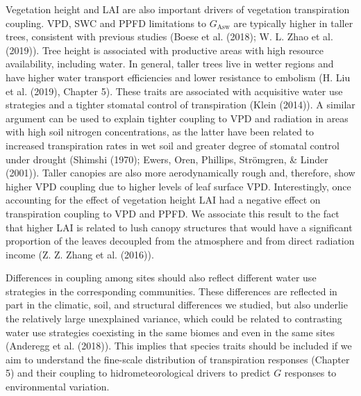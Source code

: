 \documentclass[11pt,twoside]{reedthesis}
\begin{document}
Vegetation height and LAI are also important drivers of vegetation
transpiration coupling. VPD, SWC and PPFD limitations to
\(G_{\text{Asw}}\) are typically higher in taller trees, consistent with
previous studies (Boese et al. (2018); W. L. Zhao et al. (2019)). Tree
height is associated with productive areas with high resource
availability, including water. In general, taller trees live in wetter
regions and have higher water transport efficiencies and lower
resistance to embolism (H. Liu et al. (2019), Chapter 5). These traits
are associated with acquisitive water use strategies and a tighter
stomatal control of transpiration (Klein (2014)). A similar argument can
be used to explain tighter coupling to VPD and radiation in areas with
high soil nitrogen concentrations, as the latter have been related to
increased transpiration rates in wet soil and greater degree of stomatal
control under drought (Shimshi (1970); Ewers, Oren, Phillips, Strömgren,
\& Linder (2001)). Taller canopies are also more aerodynamically rough
and, therefore, show higher VPD coupling due to higher levels of leaf
surface VPD. Interestingly, once accounting for the effect of vegetation
height LAI had a negative effect on transpiration coupling to VPD and
PPFD. We associate this result to the fact that higher LAI is related to
lush canopy structures that would have a significant proportion of the
leaves decoupled from the atmosphere and from direct radiation income
(Z. Z. Zhang et al. (2016)).\par

Differences in coupling among sites should also reflect different water
use strategies in the corresponding communities. These differences are
reflected in part in the climatic, soil, and structural differences we
studied, but also underlie the relatively large unexplained variance,
which could be related to contrasting water use strategies coexisting in
the same biomes and even in the same sites (Anderegg et al. (2018)).
This implies that species traits should be included if we aim to
understand the fine-scale distribution of transpiration responses
(Chapter 5) and their coupling to hidrometeorological drivers to predict
\(G\) responses to environmental variation.\par
\end{document}

